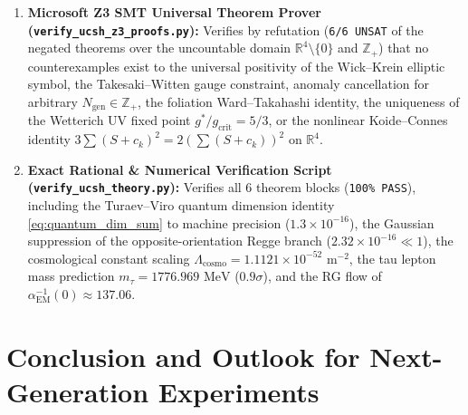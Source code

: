 \documentclass[11pt,a4paper]{article}
\theoremstyle{plain}
\theoremstyle{definition}
\theoremstyle{remark}
\newcommand{\R}{\mathbb{R}}
\newcommand{\Z}{\mathbb{Z}}
\begin{document}
\begin{enumerate}[label=\textbf{(\arabic*)}]
\begin{itemize}
    \item \texttt{topological\_\allowbreak three\_\allowbreak generations\_\allowbreak theorem}, \texttt{koide\_\allowbreak connes\_\allowbreak spectral\_\allowbreak circulant\_\allowbreak identity} \& \texttt{connes\_\allowbreak sm\_\allowbreak beta\_\allowbreak coefficients\_\allowbreak at\_\allowbreak three\_\allowbreak generations}: Exact proof of $N_{\mathrm{gen}} = \dim\Lambda^2_+(\R^4) = 3$, the nonlinear $\Z_3$-circulant Koide--Connes identity $Q_{\mathrm{Koide}} = 2/3$, and the SM one-loop beta coefficients $(10b_1, 6b_2, b_3) = (41, -19, -7)$ (Theorem~\ref{thm:flavor_koide}).
  \end{itemize}
  \item \textbf{Microsoft Z3 SMT Universal Theorem Prover (\texttt{verify\_ucsh\_z3\_proofs.py}):}
  Verifies by refutation (\texttt{6/6 UNSAT} of the negated theorems over the uncountable domain $\R^4 \setminus \{0\}$ and $\Z_+$) that no counterexamples exist to the universal positivity of the Wick--Krein elliptic symbol, the Takesaki--Witten gauge constraint, anomaly cancellation for arbitrary $N_{\mathrm{gen}} \in \Z_+$, the foliation Ward--Takahashi identity, the uniqueness of the Wetterich UV fixed point $g^*/g_{\mathrm{crit}} = 5/3$, or the nonlinear Koide--Connes identity $3\sum (S+c_k)^2 = 2(\sum (S+c_k))^2$ on $\R^4$.
  \item \textbf{Exact Rational \& Numerical Verification Script (\texttt{verify\_ucsh\_theory.py}):}
  Verifies all 6 theorem blocks (\texttt{100\% PASS}), including the Turaev--Viro quantum dimension identity \eqref{eq:quantum_dim_sum} to machine precision ($1.3 \times 10^{-16}$), the Gaussian suppression of the opposite-orientation Regge branch ($2.32 \times 10^{-16} \ll 1$), the cosmological constant scaling $\Lambda_{\mathrm{cosmo}} = 1.1121 \times 10^{-52}\text{ m}^{-2}$, the tau lepton mass prediction $m_\tau = 1776.969\text{ MeV}$ ($0.9\sigma$), and the RG flow of $\alpha_{\mathrm{EM}}^{-1}(0) \approx 137.06$.
\end{enumerate}

\section{Conclusion and Outlook for Next-Generation Experiments}
\end{document}
